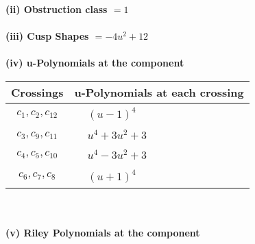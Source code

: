\documentclass[1p]{elsarticle_modified}
\theoremstyle{definition}
\begin{document}
\flushleft \textbf{(ii) Obstruction class $= 1$}\\~\\
\flushleft \textbf{(iii) Cusp Shapes $= -4 u^2+12$}\\~\\
\newpage\renewcommand{\arraystretch}{1}
\flushleft \textbf{(iv) u-Polynomials at the component}\newline \\
\begin{tabular}{m{50pt}|m{274pt}}
Crossings & \hspace{64pt}u-Polynomials at each crossing \\
\hline $$\begin{aligned}c_{1},c_{2},c_{12}\end{aligned}$$&$\begin{aligned}
&(u-1)^4
\end{aligned}$\\
\hline $$\begin{aligned}c_{3},c_{9},c_{11}\end{aligned}$$&$\begin{aligned}
&u^4+3 u^2+3
\end{aligned}$\\
\hline $$\begin{aligned}c_{4},c_{5},c_{10}\end{aligned}$$&$\begin{aligned}
&u^4-3 u^2+3
\end{aligned}$\\
\hline $$\begin{aligned}c_{6},c_{7},c_{8}\end{aligned}$$&$\begin{aligned}
&(u+1)^4
\end{aligned}$\\
\hline
\end{tabular}\\~\\
\newpage\renewcommand{\arraystretch}{1}
\flushleft \textbf{(v) Riley Polynomials at the component}\newline \\
\end{document}

